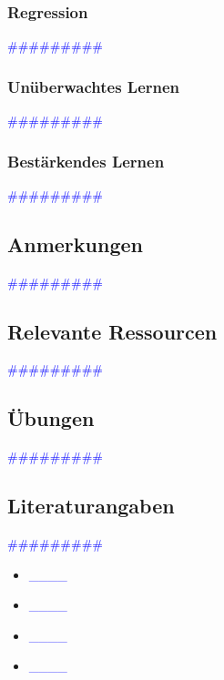 \documentclass{article}
\begin{document}
    \subsubsection{Regression} %
      \textcolor{blue}{\#\#\#\#\#\#\#\#\#}
    \subsubsection{Unüberwachtes Lernen} %
      \textcolor{blue}{\#\#\#\#\#\#\#\#\#}
    \subsubsection{Bestärkendes Lernen} %
      \textcolor{blue}{\#\#\#\#\#\#\#\#\#}
  \subsection{Anmerkungen} %
      \textcolor{blue}{\#\#\#\#\#\#\#\#\#}
  \subsection{Relevante Ressourcen} %
      \textcolor{blue}{\#\#\#\#\#\#\#\#\#}
  \subsection{Übungen} %
      \textcolor{blue}{\#\#\#\#\#\#\#\#\#}
  \subsection{Literaturangaben} %
      \textcolor{blue}{\#\#\#\#\#\#\#\#\#}

      \begin{itemize}
      \color{red}
        \item  \textcolor{blue}{\_\_\_\_}
        \item  \textcolor{blue}{\_\_\_\_}
      \color{ForestGreen}
        \item  \textcolor{blue}{\_\_\_\_}
        \item  \textcolor{blue}{\_\_\_\_}
      \end{itemize}
\end{document}
